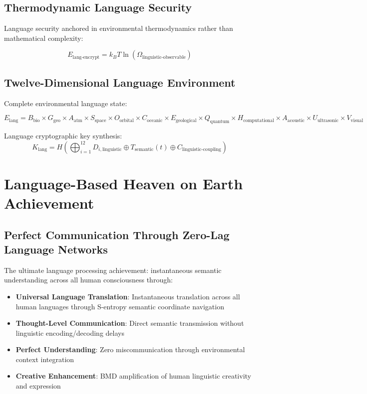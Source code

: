\documentclass[12pt,a4paper]{article}
\begin{document}
\subsection{Thermodynamic Language Security}

Language security anchored in environmental thermodynamics rather than mathematical complexity:

\begin{equation}
E_{\text{lang-encrypt}} = k_B T \ln(\Omega_{\text{linguistic-observable}})
\end{equation}

\subsection{Twelve-Dimensional Language Environment}

Complete environmental language state:

\begin{equation}
E_{\text{lang}} = B_{\text{bio}} \times G_{\text{geo}} \times A_{\text{atm}} \times S_{\text{space}} \times O_{\text{orbital}} \times C_{\text{oceanic}} \times E_{\text{geological}} \times Q_{\text{quantum}} \times H_{\text{computational}} \times A_{\text{acoustic}} \times U_{\text{ultrasonic}} \times V_{\text{visual}}
\end{equation}

Language cryptographic key synthesis:
\begin{equation}
K_{\text{lang}} = H\left(\bigoplus_{i=1}^{12} D_{i,\text{linguistic}} \oplus T_{\text{semantic}}(t) \oplus C_{\text{linguistic-coupling}}\right)
\end{equation}

\section{Language-Based Heaven on Earth Achievement}

\subsection{Perfect Communication Through Zero-Lag Language Networks}

The ultimate language processing achievement: instantaneous semantic understanding across all human consciousness through:

\begin{itemize}
\item \textbf{Universal Language Translation}: Instantaneous translation across all human languages through S-entropy semantic coordinate navigation
\item \textbf{Thought-Level Communication}: Direct semantic transmission without linguistic encoding/decoding delays
\item \textbf{Perfect Understanding}: Zero miscommunication through environmental context integration
\item \textbf{Creative Enhancement}: BMD amplification of human linguistic creativity and expression
\end{itemize}
\end{document}

